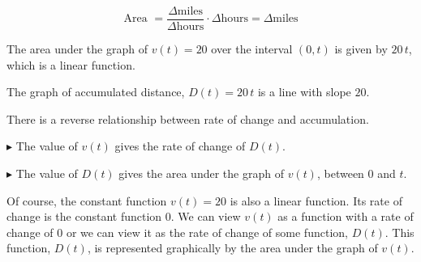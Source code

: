 \documentclass{ximera}
\begin{document}
\[
\text{Area } = \frac{\Delta \text{miles}}{\Delta \text{hours}} \cdot \Delta \text{hours} = \Delta \text{miles}
\]


The area under the graph of $v(t) = 20$ over the interval $(0, t)$ is given by $20 \, t$, which is a linear function.






The graph of accumulated distance, $D(t) = 20 \, t$ is a line with slope $20$.




\begin{image}
\end{image}
There is a reverse relationship between rate of change and accumulation. 


$\blacktriangleright$ The value of $v(t)$ gives the rate of change of $D(t)$.


$\blacktriangleright$ The value of $D(t)$ gives the area under the graph of $v(t)$, between $0$ and $t$.






Of course, the constant function $v(t) = 20$ is also a linear function. Its rate of change is the constant function $0$.  We can view $v(t)$ as a function with a rate of change of $0$ or we can view it as the rate of change of some function, $D(t)$. This function, $D(t)$, is represented graphically by the area under the graph of $v(t)$.
\end{document}
